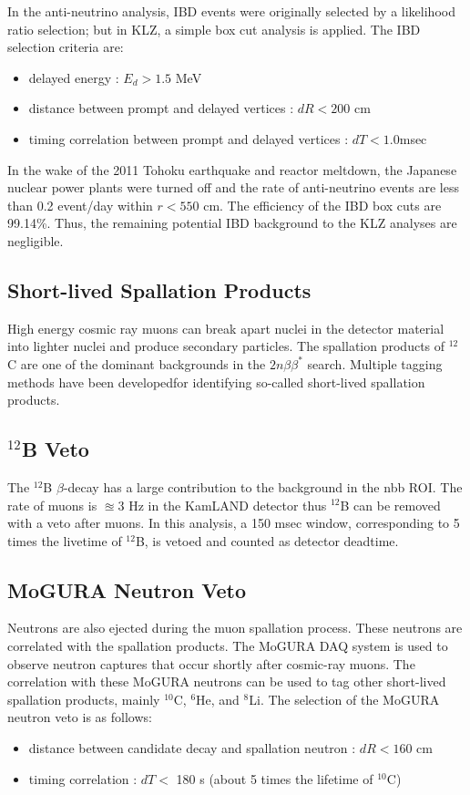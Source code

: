 In the anti-neutrino analysis, IBD events were originally selected by a likelihood ratio selection; but in KLZ, a simple box cut analysis is applied. The IBD selection criteria are:
\begin{itemize}
	\item delayed energy : $E_d>1.5$ MeV
	\item distance between prompt and delayed vertices : $dR<200$ cm
	\item timing correlation between prompt and delayed vertices : $dT < 1.0$msec
\end{itemize}
In the wake of the 2011 Tohoku earthquake and reactor meltdown, the Japanese nuclear power plants were turned off and the rate of anti-neutrino events are less than 0.2 event/day within $r<550$ cm. The efficiency of the IBD box cuts are 99.14\%. Thus, the remaining potential IBD background to the KLZ analyses are negligible.
\subsection{Short-lived Spallation Products}
High energy cosmic ray muons can break apart nuclei in the detector material into lighter nuclei and produce secondary particles. The spallation products of $^{12}$C are one of the dominant backgrounds in the $2n\beta\beta^*$ search. Multiple tagging methods have been developedfor identifying so-called short-lived spallation products.
\subsection*{$^{12}$B Veto}
The $^{12}$B $\beta$-decay has a large contribution to the background in the \0nbb ROI. The rate of muons is $\approxeq 3$ Hz in the KamLAND detector thus $^{12}$B can be removed with a veto after muons. In this analysis, a 150 msec window, corresponding to 5 times the livetime of $^{12}$B, is vetoed and counted as detector deadtime.

\subsection*{MoGURA Neutron Veto}
Neutrons are also ejected during the muon spallation process. These neutrons are correlated with the spallation products. The MoGURA DAQ system is used to observe neutron captures that occur shortly after cosmic-ray muons. The correlation with these MoGURA neutrons can be used to tag other short-lived spallation products, mainly $^{10}$C, $^{6}$He, and $^{8}$Li. The selection of the MoGURA neutron veto is as follows:
\begin{itemize}
	\item distance between candidate decay and spallation neutron : $dR<160$ cm
	\item timing correlation : $dT < $ 180 s (about 5 times the lifetime of $^{10}$C)
\end{itemize}

